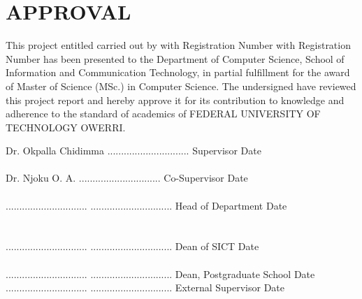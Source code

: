 \chapter*{\large APPROVAL}
This project entitled \topic carried out by {\authorname} with Registration Number with Registration Number \regno \hspace{0.1cm}has been presented to the Department of Computer Science, School of Information and Communication Technology, in partial fulfillment for the award of Master of Science (MSc.) in Computer Science.
The undersigned have reviewed this project report and hereby approve it for its contribution to knowledge and adherence to the standard of academics of FEDERAL UNIVERSITY OF TECHNOLOGY OWERRI.
 
{\singlespacing
	
	{\centering Dr. Okpalla Chidimma \hspace{9.3cm}..............................}
	{\flushleft Supervisor}   \hspace{11.6cm}Date
	\\
	\\
	
	{\centering Dr. Njoku O. A. \hspace{10.5cm}..............................}
	{\flushleft Co-Supervisor}	\hspace{11cm}Date 
	\\
	\\
	{\centering .............................. \hspace{10cm}..............................}
	Head of Department	\hspace{9.8cm}Date\\
	\\
	\\
	
	{\centering .............................. \hspace{10cm}..............................}
	Dean of SICT	\hspace{11cm}Date
	\\
	\\
	{\centering .............................. \hspace{10cm}..............................}
	Dean, Postgraduate School	\hspace{8.6cm}Date
	\\

	{\centering .............................. \hspace{10cm}..............................}
	External Supervisor	\hspace{9.9cm}Date
}